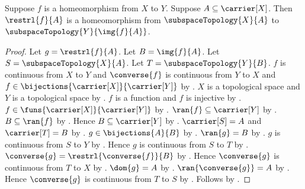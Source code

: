 \begin{classification}\label{homeomorphism_restriction_to_image}
    Suppose $f$ is a homeomorphism from $X$ to $Y$.
    Suppose $A\subseteq\carrier[X]$.
    Then $\restrl{f}{A}$ is a homeomorphism from
        $\subspaceTopology{X}{A}$ to $\subspaceTopology{Y}{\img{f}{A}}$.
\end{classification}
\begin{proof}
    Let $g=\restrl{f}{A}$.
    Let $B=\img{f}{A}$.
    Let $S=\subspaceTopology{X}{A}$.
    Let $T=\subspaceTopology{Y}{B}$.
    $f$ is continuous from $X$ to $Y$ and
        $\converse{f}$ is continuous from $Y$ to $X$ and
        $f\in\bijections{\carrier[X]}{\carrier[Y]}$ by
        .
    $X$ is a topological space and $Y$ is a topological space by
        .
    $f$ is a function and $f$ is injective by
        .
    $f\in\funs{\carrier[X]}{\carrier[Y]}$ by .
    $\ran{f}\subseteq\carrier[Y]$ by .
    $B\subseteq\ran{f}$ by .
    Hence $B\subseteq\carrier[Y]$ by .
    $\carrier[S]=A$ and $\carrier[T]=B$ by
        .
    $g\in\bijections{A}{B}$ by
        .
    $\ran{g}=B$ by .
    $g$ is continuous from $S$ to $Y$ by
        .
    Hence $g$ is continuous from $S$ to $T$ by
        .
    $\converse{g}=\restrl{\converse{f}}{B}$ by
        .
    Hence $\converse{g}$ is continuous from $T$ to $X$ by
        .
    $\dom{g}=A$ by .
    $\ran{\converse{g}}=A$ by .
    Hence $\converse{g}$ is continuous from $T$ to $S$ by
        .
    Follows by .
\end{proof}

